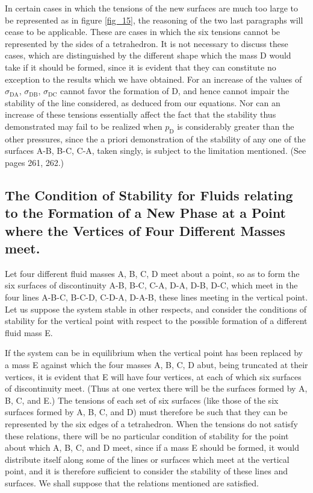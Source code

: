 \documentclass[12pt]{memoir}
\begin{document}
In certain cases in which the tensions of the new surfaces are much too large to be represented as in figure \ref{fig_15}, the reasoning of the two last paragraphs will cease to be applicable. These are cases in which the six tensions cannot be represented by the sides of a tetrahedron. It is not necessary to discuss these cases, which are distinguished by the different shape which the mass D would take if it should be formed, since it is evident that they can constitute no exception to the results which we have obtained. For an increase of the values of $\sigma_{\text{DA}}$, $\sigma_{\text{DB}}$, $\sigma_{\text{DC}}$ cannot favor the formation of D, and hence cannot impair the stability of the line considered, as deduced from our equations. Nor can an increase of these tensions essentially affect the fact that the stability thus demonstrated may fail to be realized when $p_\text{D}$ is considerably greater than the other pressures, since the a priori demonstration of the stability of any one of the surfaces A-B, B-C, C-A, taken singly, is subject to the limitation mentioned. (See pages 261, 262.)

\subsection{The Condition of Stability for Fluids relating to the Formation of a New Phase at a Point where the Vertices of Four Different Masses meet.}
Let four different fluid masses A, B, C, D meet about a point, so as to form the six surfaces of discontinuity A-B, B-C, C-A, D-A, D-B, D-C, which meet in the four lines A-B-C, B-C-D, C-D-A, D-A-B, these lines meeting in the vertical point. Let us suppose the system stable in other respects, and consider the conditions of stability for the vertical point with respect to the possible formation of a different fluid mass E.

If the system can be in equilibrium when the vertical point has been replaced by a mass E against which the four masses A, B, C, D abut, being truncated at their vertices, it is evident that E will have four vertices, at each of which six surfaces of discontinuity meet. (Thus at one vertex there will be the surfaces formed by A, B, C, and E.) The tensions of each set of six surfaces (like those of the six surfaces formed by A, B, C, and D) must therefore be such that they can be represented by the six edges of a tetrahedron. When the tensions do not satisfy these relations, there will be no particular condition of stability for the point about which A, B, C, and D meet, since if a mass E should be formed, it would distribute itself along some of the lines or surfaces which meet at the vertical point, and it is therefore sufficient to consider the stability of these lines and surfaces. We shall suppose that the relations mentioned are satisfied.
\end{document}
